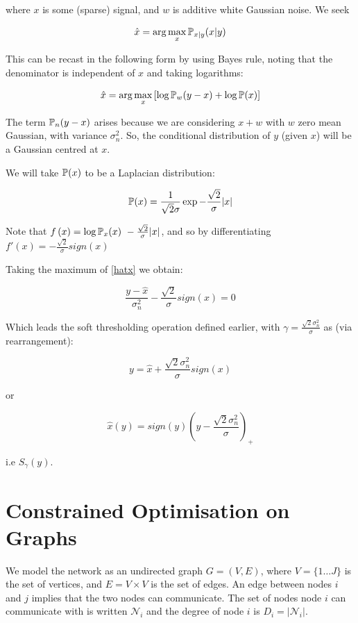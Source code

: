 \documentclass{article}
\begin{document}
where \(x\) is some (sparse) signal, and \(w\) is additive white Gaussian noise. We seek

\begin{equation}
\hat{x} = \arg\max_x {\mathbb{P}}_{x|y}{\left(x|y\right)}
\end{equation}

This can be recast in the following form by using Bayes rule, noting that the denominator is independent of \(x\) and taking logarithms:

\begin{equation}
\hat{x} = \arg\max_x \left[\log{{\mathbb{P}}_{w}{\left(y-x\right)}}+\log{{\mathbb{P}}{\left(x\right)}}\right]
\label{hatx}
\end{equation}

The term \({\mathbb{P}}_{n}{\left(y-x\right)}\) arises because we are considering \(x+w\) with \(w\) zero mean Gaussian, with variance \(\sigma_n^2\). So, the conditional distribution of \(y\) (given \(x\)) will be a Gaussian centred at \(x\).

We will take \({\mathbb{P}}{\left(x\right)}\) to be a Laplacian distribution:

\begin{equation}
{\mathbb{P}}{\left(x\right)} = \frac{1}{\sqrt{2}\sigma}\exp{-\frac{\sqrt{2}}{\sigma}|x|}
\end{equation}

Note that \( f\left(x\right) = \log{{\mathbb{P}}_x{ \left( x \right)}} ~ -\frac{\sqrt{2}}{\sigma} |x| \), and so by differentiating \( f'\left(x\right) = -\frac{\sqrt{2}}{\sigma} sign\left(x\right) \)

Taking the maximum of \ref{hatx} we obtain:

\begin{equation}
\frac{y-\hat{x}}{\sigma^2_n}-\frac{\sqrt{2}}{\sigma}sign(x) = 0
\end{equation}

Which leads the soft thresholding operation defined earlier, with \(\gamma = \frac{\sqrt{2}\sigma^2_n}{\sigma}\) as (via rearrangement):

$$
y =  \hat{x} + \frac{\sqrt{2}\sigma^2_n}{\sigma}sign\left(x\right)
$$

or

$$
\hat{x}\left(y\right) = sign(y)\left(y - \frac{\sqrt{2}\sigma^2_n}{\sigma}\right)_+
$$

i.e \(S_\gamma(y)\).

\section{Constrained Optimisation on Graphs}\label{sec:opt-on-graphs}
We model the network as an undirected graph \(G = \left(V,E\right)\), where \(V = \{1 \ldots J\}\) is the set of vertices, and \(E = V \times V\) is the set of edges. An edge between nodes \(i\) and \(j\) implies that the two nodes can communicate. The set of nodes node \(i\) can communicate with is written \(\mathcal{N}_i\) and the degree of node \(i\) is \(D_i = |\mathcal{N}_i|\). 
\end{document}
